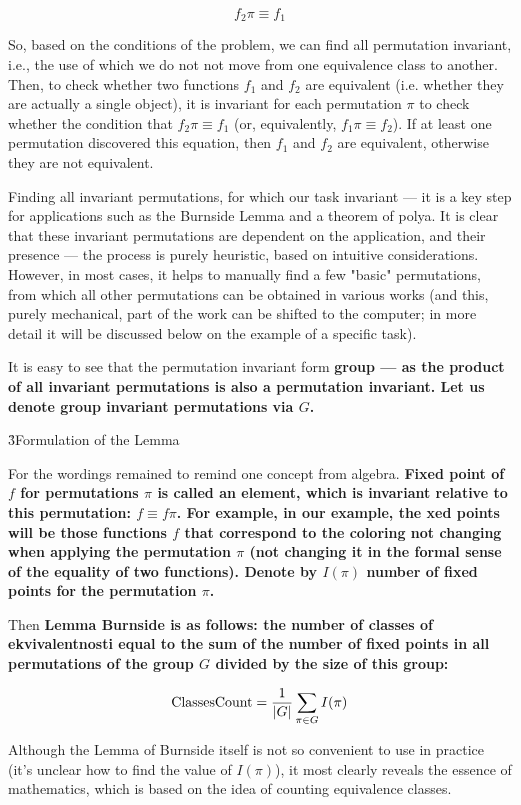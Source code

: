 $$ f_2 \pi \equiv f_1 $$

So, based on the conditions of the problem, we can find all permutation invariant, i.e., the use of which we do not not move from one equivalence class to another. Then, to check whether two functions $f_1$ and $f_2$ are equivalent (i.e. whether they are actually a single object), it is invariant for each permutation $\pi$ to check whether the condition that $f_2 \pi \equiv f_1$ (or, equivalently, $f_1 \pi \equiv f_2$). If at least one permutation discovered this equation, then $f_1$ and $f_2$ are equivalent, otherwise they are not equivalent.

Finding all invariant permutations, for which our task invariant --- it is a key step for applications such as the Burnside Lemma and a theorem of polya. It is clear that these invariant permutations are dependent on the application, and their presence --- the process is purely heuristic, based on intuitive considerations. However, in most cases, it helps to manually find a few "basic" permutations, from which all other permutations can be obtained in various works (and this, purely mechanical, part of the work can be shifted to the computer; in more detail it will be discussed below on the example of a specific task).

It is easy to see that the permutation invariant form \bf{group} --- as the product of all invariant permutations is also a permutation invariant. Let us denote \bf{group invariant permutations} via $G$.

\h3{Formulation of the Lemma}

For the wordings remained to remind one concept from algebra. \bf{Fixed point} of $f$ for permutations $\pi$ is called an element, which is invariant relative to this permutation: $f \equiv f \pi$. For example, in our example, the xed points will be those functions $f$ that correspond to the coloring not changing when applying the permutation $\pi$ (not changing it in the formal sense of the equality of two functions). Denote by $I(\pi)$ \bf{number of fixed points} for the permutation $\pi$.

Then \bf{Lemma Burnside} is as follows: the number of classes of ekvivalentnosti equal to the sum of the number of fixed points in all permutations of the group $G$ divided by the size of this group:

$$ {\rm ClassesCount} = \frac{1}{|G|} \sum_{\pi \in G} I(\pi) $$

Although the Lemma of Burnside itself is not so convenient to use in practice (it's unclear how to find the value of $I(\pi)$), it most clearly reveals the essence of mathematics, which is based on the idea of counting equivalence classes.

